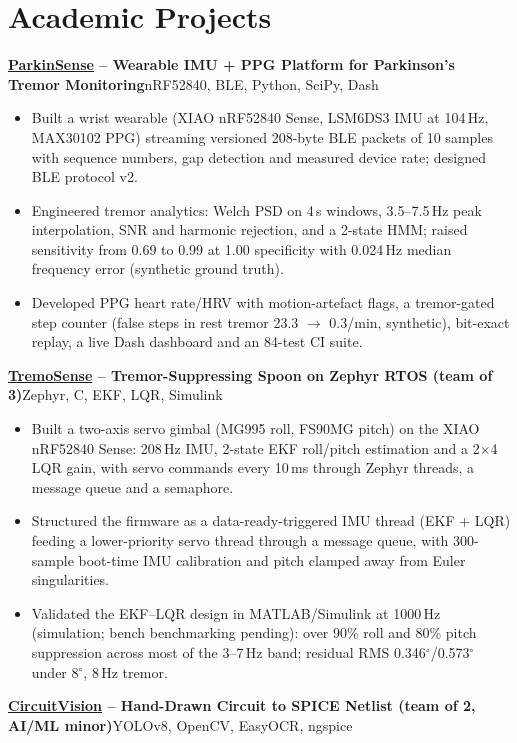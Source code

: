 \documentclass[10pt,letterpaper]{article}
\newcommand{\lnk}[2]{\href{#1}{\textcolor{linkblue}{#2}}}
\newcommand{\proj}[2]{\par\vspace{2pt}\textbf{#1}\hfill{\small #2}\par}
\begin{document}
\section{Academic Projects}
\proj{\lnk{https://github.com/sudo-pranshu/ParkinSense}{ParkinSense} -- Wearable IMU + PPG Platform for Parkinson's Tremor Monitoring}{nRF52840, BLE, Python, SciPy, Dash}
\begin{itemize}
\item Built a wrist wearable (XIAO nRF52840 Sense, LSM6DS3 IMU at 104\,Hz, MAX30102 PPG) streaming versioned 208-byte BLE packets of 10 samples with sequence numbers, gap detection and measured device rate; designed BLE protocol v2.
\item Engineered tremor analytics: Welch PSD on 4\,s windows, 3.5--7.5\,Hz peak interpolation, SNR and harmonic rejection, and a 2-state HMM; raised sensitivity from 0.69 to 0.99 at 1.00 specificity with 0.024\,Hz median frequency error (synthetic ground truth).
\item Developed PPG heart rate/HRV with motion-artefact flags, a tremor-gated step counter (false steps in rest tremor 23.3 $\to$ 0.3/min, synthetic), bit-exact replay, a live Dash dashboard and an 84-test CI suite.
\end{itemize}
\proj{\lnk{https://github.com/rkt-1597/TremoSense-Project}{TremoSense} -- Tremor-Suppressing Spoon on Zephyr RTOS (team of 3)}{Zephyr, C, EKF, LQR, Simulink}
\begin{itemize}
\item Built a two-axis servo gimbal (MG995 roll, FS90MG pitch) on the XIAO nRF52840 Sense: 208\,Hz IMU, 2-state EKF roll/pitch estimation and a 2$\times$4 LQR gain, with servo commands every 10\,ms through Zephyr threads, a message queue and a semaphore.
\item Structured the firmware as a data-ready-triggered IMU thread (EKF + LQR) feeding a lower-priority servo thread through a message queue, with 300-sample boot-time IMU calibration and pitch clamped away from Euler singularities.
\item Validated the EKF--LQR design in MATLAB/Simulink at 1000\,Hz (simulation; bench benchmarking pending): over 90\% roll and 80\% pitch suppression across most of the 3--7\,Hz band; residual RMS 0.346$^\circ$/0.573$^\circ$ under 8$^\circ$, 8\,Hz tremor.
\end{itemize}
\proj{\lnk{https://github.com/sudo-pranshu/CircuitVision}{CircuitVision} -- Hand-Drawn Circuit to SPICE Netlist (team of 2, AI/ML minor)}{YOLOv8, OpenCV, EasyOCR, ngspice}
\end{document}
